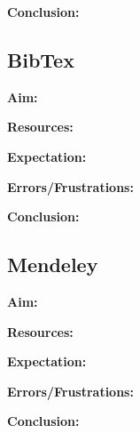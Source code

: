 \documentclass{article}
\begin{document}
\textbf{Conclusion:}

\subsection{BibTex}

\textbf{Aim:}

\textbf{Resources:}

\textbf{Expectation:}

\label{Error: BibTex Errors/Frustrations}
\textbf{Errors/Frustrations:}

\textbf{Conclusion:}

\subsection{Mendeley}

\textbf{Aim:}

\textbf{Resources:}

\textbf{Expectation:}

\label{Error: Mendeley Errors/Frustrations}
\textbf{Errors/Frustrations:}

\textbf{Conclusion:}
\end{document}
